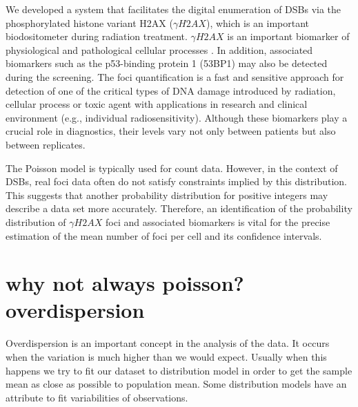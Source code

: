 
We developed a system that facilitates the digital  enumeration of DSBs via the phosphorylated histone  variant H2AX ($\gamma H2AX$), which is an important  biodositometer during radiation treatment. $\gamma H2AX$ is an important biomarker of physiological and pathological cellular processes \cite{reddig_dna_2018,rodiger_quantification_2018}. In addition, associated biomarkers such as the p53-binding protein 1 (53BP1) may also be detected during the screening. The foci quantification is a fast and sensitive approach for detection of one of the critical types of DNA damage introduced by radiation, cellular process or toxic agent with applications in research and clinical environment (e.g., individual radiosensitivity). Although these biomarkers play a crucial role in diagnostics, their levels vary not only between patients but also between replicates.

The Poisson model is typically used for count data. However, in the context of DSBs, real foci data often do not satisfy constraints implied by this distribution. This suggests that another probability distribution for positive integers may describe a data set more accurately. Therefore, an identification of the probability distribution of $\gamma H2AX$ foci and associated biomarkers is vital for the precise estimation of the mean number of foci per cell and its confidence intervals.


\section{why not always poisson? overdispersion}

Overdispersion is an important concept in the analysis of the data. It occurs when the variation is much higher than we would expect. Usually when this happens we try to fit our dataset to distribution model in order to get the sample mean as close as possible to population mean. Some distribution models have an attribute to fit variabilities of observations.

